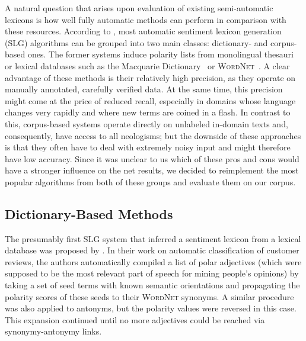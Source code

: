 A natural question that arises upon evaluation of existing
semi-automatic lexicons is how well fully automatic methods can
perform in comparison with these resources.  According to
\citet[p. 79]{Liu:12}, most automatic sentiment lexicon generation
(SLG) algorithms can be grouped into two main classes: dictionary- and
corpus-based ones.  The former systems induce polarity lists from
monolingual thesauri or lexical databases such as the Macquarie
Dictionary~\cite{Bernard:86} or \textsc{WordNet}~\cite{Miller:95}.  A
clear advantage of these methods is their relatively high precision,
as they operate on manually annotated, carefully verified data.  At
the same time, this precision might come at the price of reduced
recall, especially in domains whose language changes very rapidly and
where new terms are coined in a flash.  In contrast to this,
corpus-based systems operate directly on unlabeled in-domain texts
and, consequently, have access to all neologisms; but the downside of
these approaches is that they often have to deal with extremely noisy
input and might therefore have low accuracy.  Since it was unclear to
us which of these pros and cons would have a stronger influence on the
net results, we decided to reimplement the most popular algorithms
from both of these groups and evaluate them on our corpus.

\subsection{Dictionary-Based Methods}

The presumably first SLG system that inferred a sentiment lexicon from
a lexical database was proposed by \citet{Hu:04}.  In their work on
automatic classification of customer reviews, the authors
automatically compiled a list of polar adjectives (which were supposed
to be the most relevant part of speech for mining people's opinions)
by taking a set of seed terms with known semantic orientations and
propagating the polarity scores of these seeds to their
\textsc{WordNet} synonyms.  A similar procedure was also applied to
antonyms, but the polarity values were reversed in this case.  This
expansion continued until no more adjectives could be reached via
synonymy-antonymy links.

